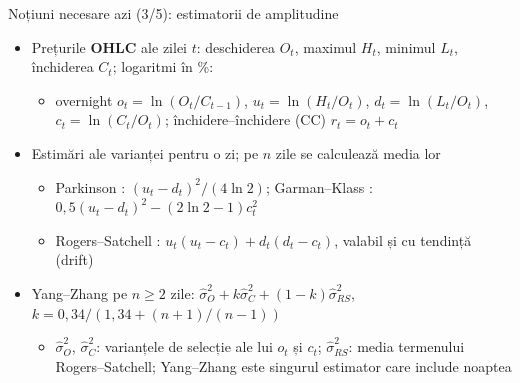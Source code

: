 \begin{frame}{Noțiuni necesare azi (3/5): estimatorii de amplitudine}
\itemsize{\small}
\begin{itemize}
    \item Prețurile \textbf{OHLC} ale zilei $t$: deschiderea $O_t$, maximul $H_t$, minimul $L_t$, închiderea $C_t$; logaritmi în \%:
    \begin{itemize}
        \item overnight $o_t = \ln(O_t/C_{t-1})$, $u_t = \ln(H_t/O_t)$, $d_t = \ln(L_t/O_t)$, $c_t = \ln(C_t/O_t)$; închidere--închidere (CC) $r_t = o_t + c_t$
    \end{itemize}
    \item Estimări ale varianței pentru o zi; pe $n$ zile se calculează media lor
    \begin{itemize}
        \item Parkinson : $(u_t - d_t)^2/(4\ln 2)$; Garman--Klass : $0{,}5(u_t - d_t)^2 - (2\ln 2 - 1)c_t^2$
        \item Rogers--Satchell : $u_t(u_t - c_t) + d_t(d_t - c_t)$, valabil și cu tendință (drift)
    \end{itemize}
    \item Yang--Zhang  pe $n \ge 2$ zile: $\hat\sigma_O^2 + k\hat\sigma_C^2 + (1-k)\hat\sigma_{RS}^2$, $k = 0{,}34/(1{,}34 + (n+1)/(n-1))$
    \begin{itemize}
        \item $\hat\sigma_O^2$, $\hat\sigma_C^2$: varianțele de selecție ale lui $o_t$ și $c_t$; $\hat\sigma_{RS}^2$: media termenului Rogers--Satchell; Yang--Zhang este singurul estimator care include noaptea
    \end{itemize}
\end{itemize}
\end{frame}

